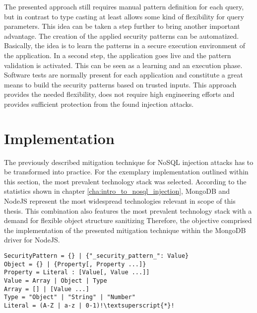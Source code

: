 The presented approach still requires manual pattern definition for each query, but in contrast to type casting at least allows some kind of flexibility for query parameters. This idea can be taken a step further to bring another important advantage. The creation of the applied security patterns can be automatized. Basically, the idea is to learn the patterns in a secure execution environment of the application. In a second step, the application goes live and the pattern validation is activated. This can be seen as a learning and an execution phase. Software tests are normally present for each application and constitute a great means to build the security patterns based on trusted inputs. This approach provides the needed flexibility, does not require high engineering efforts and provides sufficient protection from the found injection attacks.

\section{Implementation}
The previously described mitigation technique for NoSQL injection attacks has to be transformed into practice. For the exemplary implementation outlined within this section, the most prevalent technology stack was selected. According to the statistics shown in chapter \ref{cha:intro_to_nosql_injection}, MongoDB and NodeJS represent the most widespread technologies relevant in scope of this thesis. This combination also features the most prevalent technology stack with a demand for flexible object structure sanitizing Therefore, the objective comprised the implementation of the presented mitigation technique within the MongoDB driver for NodeJS. 

\begin{lstlisting}[escapechar=!, caption={Proposed security pattern grammar for the the injection mitigation mechanism}, label={lst:http_request_example}]
SecurityPattern = {} | {"_security_pattern_": Value}
Object = {} | {Property[, Property ...]}
Property = Literal : [Value[, Value ...]]
Value = Array | Object | Type
Array = [] | [Value ...]
Type = "Object" | "String" | "Number"
Literal = (A-Z | a-z | 0-1)!\textsuperscript{*}!
\end{lstlisting}



